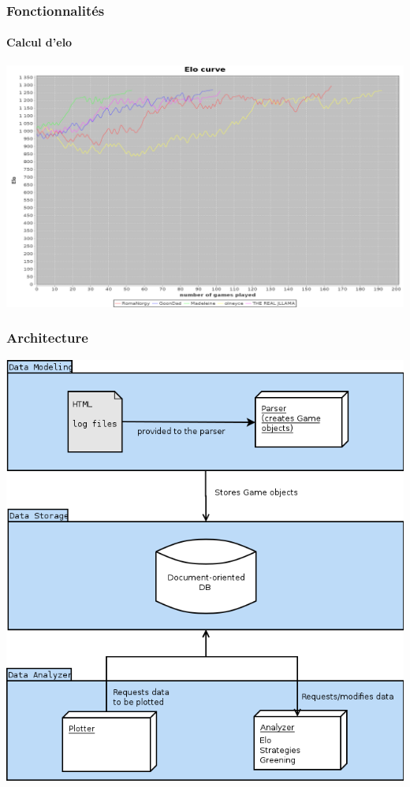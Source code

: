 \documentclass{beamer}
\begin{document}
\begin{frame}
  \frametitle{Fonctionnalités}
  \framesubtitle{Calcul d'elo}
  \begin{center}
    \includegraphics[scale=0.15,keepaspectratio]{elo}
  \end{center}
\end{frame}

\begin{frame}
  \frametitle{Architecture}
  \begin{center}
    \includegraphics[scale=0.30,keepaspectratio]{globalArch_v2}
    \end{center}
\end{frame}
\end{document}
